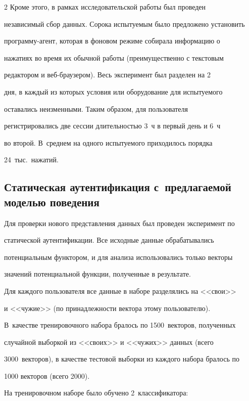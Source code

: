 \begin{multicols}{2}
Кроме этого, в рамках исследовательской работы был проведен

независимый сбор данных. Сорока испытуемым было предложено установить

про\-грам\-му-агент, которая в фоновом режиме собирала информацию о

нажатиях во время их обычной работы (преимущественно с текстовым

редактором и веб-брау\-зе\-ром). Весь эксперимент был  разделен на 2

дня, в каждый из которых условия или оборудование для  испытуемого

оставались неизменными. Таким образом, для пользователя

регистрировались две сессии длительностью 3~ч в первый день и 6~ч 

во второй. В~среднем на одного испытуемого приходилось порядка

24~тыс.\ нажатий.



\subsection{Статическая аутентификация с~предлагаемой моделью поведения}



Для проверки нового представления данных был проведен эксперимент по

статической аутентификации. Все исходные данные обрабатывались

потенциальным функтором, и для анализа использовались только векторы

значений потенциальной функции, полученные в результате.



Для каждого пользователя все данные в наборе разделялись на <<свои>>

и <<чужие>> (по принадлежности вектора этому пользователю). 

В~качестве тренировочного набора бралось по 1500~векторов, полученных

случайной выборкой из <<своих>> и <<чужих>> данных (всего 

3000~векторов), в качестве тес\-то\-вой выборки из каждого набора бралось по

1000 векторов (всего 2000).



На тренировочном наборе было обучено 2~классификатора:

\begin{enumerate}[(1)]


\end{enumerate}
\end{multicols}
